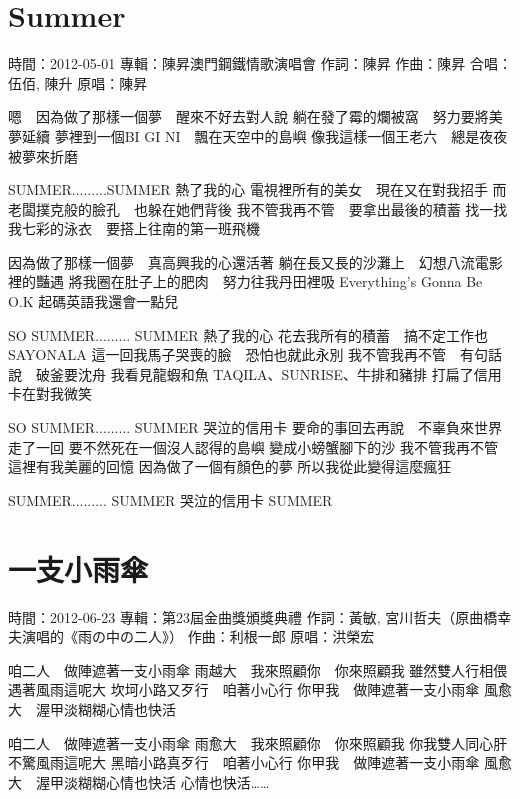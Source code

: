 \documentclass[UTF8,a4paper,oneside,twocolumn,12pt]{ctexbook}
\newcommand{\infopair}[2]{\textbullet #1：#2}
\newcommand{\zc}[1][伍佰]{\infopair{作詞}{#1}}
\newcommand{\zq}[1][伍佰]{\infopair{作曲}{#1}}
\newcommand{\zj}[1]{\infopair{專輯}{#1}}
\newcommand{\yc}[1]{\infopair{原唱}{#1}}
\newcommand{\sj}[1]{\infopair{時間}{#1}}
\newenvironment{info}{\begin{flushleft}\kaishu
	}
	{\end{flushleft}\normalsize\yahei\par}
\newenvironment{lyric}{
	}
{}
\begin{document}
\section{Summer} %
\begin{info}
	\sj{2012-05-01}
	\zj{陳昇澳門鋼鐵情歌演唱會}
	\zc[陳昇]
	\zq[陳昇]
	\infopair{合唱}{伍佰, 陳升}
	\yc{陳昇}
\end{info}
\begin{lyric}
	嗯　因為做了那樣一個夢　醒來不好去對人說
	躺在發了霉的爛被窩　努力要將美夢延續
	夢裡到一個BI GI NI　飄在天空中的島嶼
	像我這樣一個王老六　總是夜夜被夢來折磨

	SUMMER.........SUMMER 熱了我的心
	電視裡所有的美女　現在又在對我招手
	而老闆撲克般的臉孔　也躲在她們背後
	我不管我再不管　要拿出最後的積蓄
	找一找我七彩的泳衣　要搭上往南的第一班飛機

	因為做了那樣一個夢　真高興我的心還活著
	躺在長又長的沙灘上　幻想八流電影裡的豔遇
	將我圈在肚子上的肥肉　努力往我丹田裡吸
	Everything's Gonna Be O.K
	起碼英語我還會一點兒

	SO SUMMER.........
	SUMMER 熱了我的心
	花去我所有的積蓄　搞不定工作也 SAYONALA
	這一回我馬子哭喪的臉　恐怕也就此永別
	我不管我再不管　有句話說　破釜要沈舟
	我看見龍蝦和魚 TAQILA、SUNRISE、牛排和豬排
	打扁了信用卡在對我微笑

	SO SUMMER.........
	SUMMER 哭泣的信用卡
	要命的事回去再說　不辜負來世界走了一回
	要不然死在一個沒人認得的島嶼
	變成小螃蟹腳下的沙
	我不管我再不管　這裡有我美麗的回憶
	因為做了一個有顏色的夢
	所以我從此變得這麼瘋狂

	SUMMER.........
	SUMMER 哭泣的信用卡
	SUMMER
\end{lyric}

\section{一支小雨傘}
\begin{info}
	\sj{2012-06-23}
	\zj{第23屆金曲獎頒獎典禮}
	\zc[黃敏, 宮川哲夫（原曲橋幸夫演唱的《雨の中の二人》）]
	\zq[利根一郎]
	\yc{洪榮宏}
\end{info}
\begin{lyric}
	咱二人　做陣遮著一支小雨傘
	雨越大　我來照顧你　你來照顧我
	雖然雙人行相偎　遇著風雨這呢大
	坎坷小路又歹行　咱著小心行
	你甲我　做陣遮著一支小雨傘
	風愈大　渥甲淡糊糊心情也快活

	咱二人　做陣遮著一支小雨傘
	雨愈大　我來照顧你　你來照顧我
	你我雙人同心肝　不驚風雨這呢大
	黑暗小路真歹行　咱著小心行
	你甲我　做陣遮著一支小雨傘
	風愈大　渥甲淡糊糊心情也快活
	心情也快活……
\end{lyric}
\end{document}
